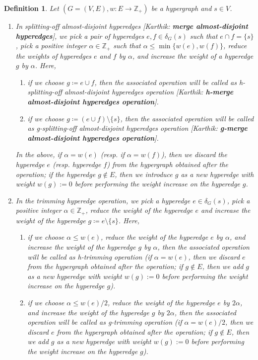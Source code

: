 \documentclass{article}
\newtheorem{definition}{Definition}[section]
\newcommand{\knote}[1]{{\color{red}[{\tiny Karthik: \bf #1}]\marginpar{\color{red}*}}}
\providecommand{\Z}{\mathbb{Z}}
\begin{document}
\iffalse
\begin{definition}\label{defn:splitting-off}
    Let $(G=(V, E), w: E\rightarrow \Z_+)$ be a hypergraph and $s\in V$. 
    \begin{enumerate}
        
        
        \item 
        In \emph{splitting-off almost-disjoint hyperedges} \knote{\emph{merge almost-disjoint hyperedges}}, we pick a pair of hyperedges $e, f\in \delta_G(s)$ such that $e\cap f=\{s\}$, pick a positive integer $\alpha \in \Z_+$ such that $\alpha\le \min\{w(e), w(f)\}$, reduce the weights of hyperedges $e$ and $f$ by $\alpha$, and increase the weight of a hyperedge $g$ by $\alpha$. Here, 
        \begin{enumerate}
            \item if we choose $g\coloneqq e \cup f$, then the associated operation will be called as \emph{h-splitting-off almost-disjoint hyperedges operation} \knote{\emph{h-merge almost-disjoint hyperedges operation}}.
            \item if we choose $g\coloneqq (e\cup f)\setminus \{s\}$, then the associated operation will be called as \emph{g-splitting-off almost-disjoint hyperedges operation} \knote{\emph{g-merge almost-disjoint hyperedges operation}}.
        \end{enumerate}
        In the above, if $\alpha=w(e)$ (resp. if $\alpha = w(f)$), then we discard the hyperedge $e$ (resp. hyperedge $f$) from the hypergraph obtained after the operation; if the hyperedge $g\not\in E$, then we introduce $g$ as a new hyperedge with weight $w(g) := 0$ before performing the weight increase on the hyperedge $g$.
    
        \item 
        In the \emph{trimming hyperedge operation}, we pick a hyperedge $e\in \delta_G(s)$, pick a positive integer $\alpha \in \Z_+$,
        reduce the weight of the hyperedge $e$ and 
        increase the weight of the hyperedge $g\coloneqq e\setminus \{s\}$. Here, 
        \begin{enumerate}
            \item if we choose $\alpha \le w(e)$, reduce the weight of the hyperedge $e$ by $\alpha$,  and increase the weight of the hyperedge $g$ by $\alpha$, then the associated operation will be called as \emph{h-trimming operation} (if $\alpha=w(e)$, then we discard $e$ from the hypergraph obtained after the operation; if $g\not\in E$, then we add $g$ as a new hyperedge with weight $w(g) := 0$ before performing the weight increase on the hyperedge $g$). 
            \item if we choose $\alpha \le w(e)/2$, reduce the weight of the hyperedge $e$ by $2\alpha$, and increase the weight of the hyperedge $g$ by $2\alpha$, then the associated operation will be called as \emph{g-trimming operation} (if $\alpha=w(e)/2$, then we discard $e$ from the hypergraph obtained after the operation; if $g\not\in E$, then we add $g$ as a new hyperedge with weight $w(g) := 0$ before performing the weight increase on the hyperedge $g$).  
        \end{enumerate}


\end{enumerate}
\end{definition}
\end{document}
